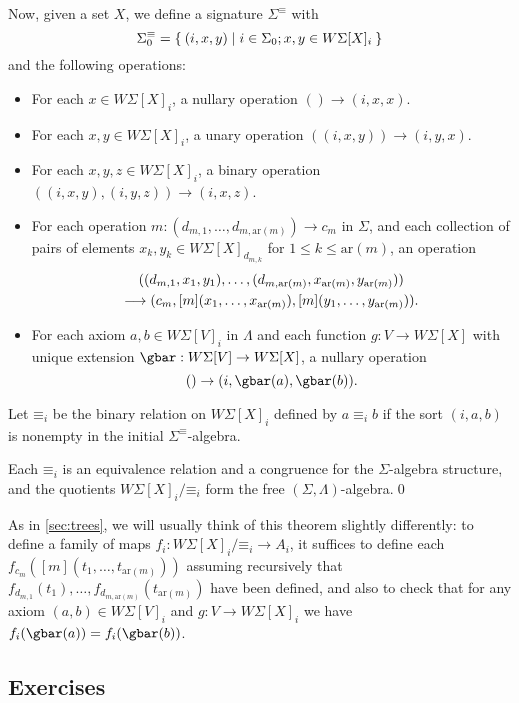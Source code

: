 \documentclass{book}
\def\ay{\mathrm{ar}}
\def\sig{\Sigma}
\def\axes{\Lambda}
\def\act#1{[#1]}
\def\equivsym{\mathord{\equiv}}
\begin{document}
Now, given a set $X$, we define a signature $\sig^{\equivsym}$ with
\[\sig^{\equivsym}_0 = \setof{(i,x,y) | i\in \sig_0; x,y\in W\sig[X]_i}\]
and the following operations:
\begin{itemize}
\item For each $x\in W\sig[X]_i$, a nullary operation $() \to (i,x,x)$.
\item For each $x,y\in W\sig[X]_i$, a unary operation $((i,x,y)) \to (i,y,x)$.
\item For each $x,y,z\in W\sig[X]_i$, a binary operation $((i,x,y),(i,y,z)) \to (i,x,z)$.
\item For each operation $m:(d_{m,1},\dots,d_{m,\ay(m)}) \to c_m$ in $\sig$, and each collection of pairs of elements $x_k,y_k \in W\sig[X]_{d_{m,k}}$ for $1\le k\le \ay(m)$, an operation
  \begin{multline*}
    ((d_{m,1},x_1,y_1),\dots,(d_{m,\ay(m)},x_{\ay(m)},y_{\ay(m)})) \\\too
    (c_m, \act m(x_1,\dots,x_{\ay(m)}), \act m(y_1,\dots,y_{\ay(m)})).
  \end{multline*}
\item For each axiom $a,b\in W\sig[V]_i$ in $\axes$ and each function $g:V\to W\sig[X]$ with unique extension $\gbar:W\sig[V]\to W\sig[X]$, a nullary operation
  \[ () \to (i,\gbar(a),\gbar(b)). \]
\end{itemize}
Let $\equivsym_i$ be the binary relation on $W\sig[X]_i$ defined by $a\equiv_i b$ if the sort $(i,a,b)$ is nonempty in the initial $\sig^{\equivsym}$-algebra.

\begin{thm}\label{thm:tree-quotient}
  Each $\equivsym_i$ is an equivalence relation and a congruence for the $\sig$-algebra structure, and the quotients $W\sig[X]_i/\equivsym_i$ form the free $(\sig,\axes)$-algebra.\qed
\end{thm}

As in \cref{sec:trees}, we will usually think of this theorem slightly differently: to define a family of maps $f_i:W\sig[X]_i/\equivsym_i\to A_i$, it suffices to define each $f_{c_m}(\act m(t_1,\dots,t_{\ay(m)}))$ assuming recursively that $f_{d_{m,1}}(t_1),\dots, f_{d_{m,\ay(m)}}(t_{\ay(m)})$ have been defined, and also to check that for any axiom $(a,b)\in W\sig[V]_i$ and $g:V\to W\sig[X]_i$ we have $f_i(\gbar(a))=f_i(\gbar(b))$.

\subsection*{Exercises}
\end{document}
